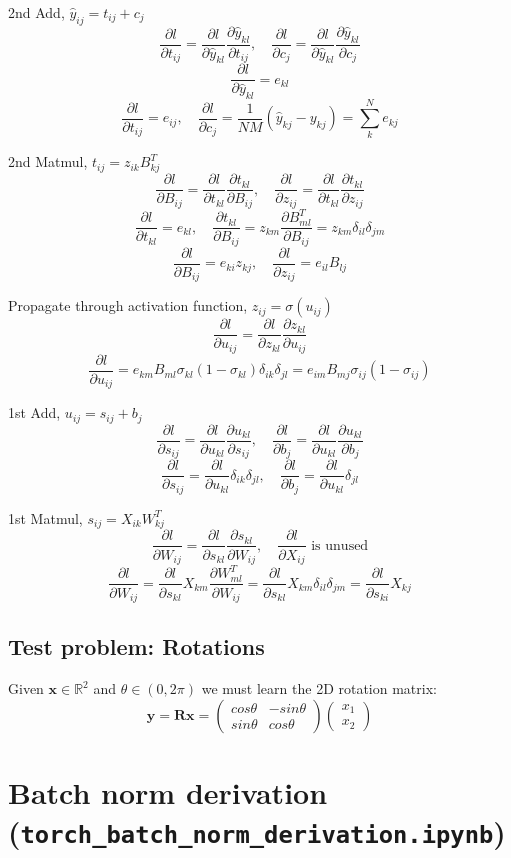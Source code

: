 \documentclass[11pt]{article}
\newcommand{\pd}[2]{\frac{\partial #1}{\partial #2}}
\begin{document}
2nd Add, $\hat{y}_{ij} = t_{ij} + c_j$
\[
\pd{l}{t_{ij}} = \pd{l}{\hat{y}_{kl}} \pd{\hat{y}_{kl}}{t_{ij}}, \quad \pd{l}{c_j} = \pd{l}{\hat{y}_{kl}} \pd{\hat{y}_{kl}}{c_j}
\]
\[
\pd{l}{\hat{y}_{kl}} = e_{kl}
\]
\[
\pd{l}{t_{ij}} = e_{ij}, \quad \pd{l}{c_j} = \frac{1}{NM} (\hat{y}_{kj} - y_{kj}) = \sum_k^N  e_{kj}
\]

2nd Matmul, $t_{ij} = z_{ik} B^{T}_{kj}$
\[
\pd{l}{B_{ij}} = \pd{l}{t_{kl}} \pd{t_{kl}}{B_{ij}}, \quad \pd{l}{z_{ij}} = \pd{l}{t_{kl}} \pd{t_{kl}}{z_{ij}}
\]
\[
\pd{l}{t_{kl}} = e_{kl}, \quad \pd{t_{kl}}{B_{ij}} = z_{km}\pd{B_{ml}^T}{B_{ij}} = z_{km}\delta_{il}\delta_{jm}
\]
\[
\pd{l}{B_{ij}} = e_{ki} z_{kj}, \quad \pd{l}{z_{ij}} = e_{il}B_{lj}
\]

Propagate through activation function, $z_{ij} = \sigma(u_{ij})$
\[
\pd{l}{u_{ij}} = \pd{l}{z_{kl}}\pd{z_{kl}}{u_{ij}}
\]
\[
\pd{l}{u_{ij}} = e_{km}{B_{ml}}\sigma_{kl}(1-\sigma_{kl})\delta_{ik}\delta_{jl} = e_{im}{B_{mj}}\sigma_{ij}(1-\sigma_{ij})
\]

1st Add, $u_{ij} = s_{ij} + b_j$
\[
\pd{l}{s_{ij}} = \pd{l}{u_{kl}} \pd{u_{kl}}{s_{ij}} , \quad \pd{l}{b_j} = \pd{l}{u_{kl}} \pd{u_{kl}}{b_j}
\]
\[
\pd{l}{s_{ij}} = \pd{l}{u_{kl}} \delta_{ik}\delta_{jl}, \quad \pd{l}{b_j} = \pd{l}{u_{kl}} \delta_{jl}
\]

1st Matmul, $s_{ij} = X_{ik} W_{kj}^T$
\[
\pd{l}{W_{ij}} = \pd{l}{s_{kl}}\pd{s_{kl}}{W_{ij}}, \quad \pd{l}{X_{ij}} \text{ is unused}
\]
\[
\pd{l}{W_{ij}} = \pd{l}{s_{kl}} X_{km} \pd{W_{ml}^T}{W_{ij}} = \pd{l}{s_{kl}} X_{km} \delta_{il} \delta_{jm} = \pd{l}{s_{ki}} X_{kj}
\]

\subsection{Test problem: Rotations}

Given $\mathbf{x} \in \mathbb{R}^2$ and $\theta \in (0, 2 \pi)$ we must learn
the 2D rotation matrix:
\[
\mathbf{y} = \mathbf{R} \mathbf{x} = \begin{pmatrix} cos\theta & -sin\theta \\ sin\theta & cos\theta \end{pmatrix} \begin{pmatrix} x_1 \\ x_2 \end{pmatrix}
\]

\section{Batch norm derivation (\texttt{torch\_batch\_norm\_derivation.ipynb})}
\end{document}
